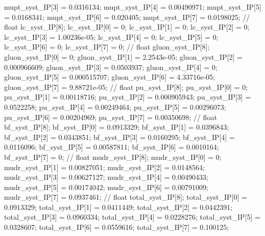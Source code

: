 mupt_syst_IP[3] = 0.0316134; mupt_syst_IP[4] = 0.00490971; mupt_syst_IP[5] = 0.0168341; 
mupt_syst_IP[6] = 0.020405; mupt_syst_IP[7] = 0.0198025; 
// float lc_syst_IP[8];
lc_syst_IP[0] = 0; lc_syst_IP[1] = 0; lc_syst_IP[2] = 0; 
lc_syst_IP[3] = 1.00236e-05; lc_syst_IP[4] = 0; lc_syst_IP[5] = 0; 
lc_syst_IP[6] = 0; lc_syst_IP[7] = 0; 
// float gluon_syst_IP[8];
gluon_syst_IP[0] = 0; gluon_syst_IP[1] = 2.2543e-05; gluon_syst_IP[2] = 0.000966609; 
gluon_syst_IP[3] = 0.0503937; gluon_syst_IP[4] = 0; gluon_syst_IP[5] = 0.000515707; 
gluon_syst_IP[6] = 4.33716e-05; gluon_syst_IP[7] = 9.88721e-05; 
// float pu_syst_IP[8];
pu_syst_IP[0] = 0; pu_syst_IP[1] = 0.00118716; pu_syst_IP[2] = 0.000905943; 
pu_syst_IP[3] = 0.0522258; pu_syst_IP[4] = 0.00249464; pu_syst_IP[5] = 0.00296073; 
pu_syst_IP[6] = 0.00204969; pu_syst_IP[7] = 0.00350698; 
// float bf_syst_IP[8];
bf_syst_IP[0] = 0.0913329; bf_syst_IP[1] = 0.0396843; bf_syst_IP[2] = 0.0343851; 
bf_syst_IP[3] = 0.0160295; bf_syst_IP[4] = 0.0116096; bf_syst_IP[5] = 0.00587811; 
bf_syst_IP[6] = 0.0010164; bf_syst_IP[7] = 0; 
// float mudr_syst_IP[8];
mudr_syst_IP[0] = 0; mudr_syst_IP[1] = 0.00827051; mudr_syst_IP[2] = 0.0148564; 
mudr_syst_IP[3] = 0.00627127; mudr_syst_IP[4] = 0.00490433; mudr_syst_IP[5] = 0.00174042; 
mudr_syst_IP[6] = 0.00791009; mudr_syst_IP[7] = 0.0937461; 
// float total_syst_IP[8];
total_syst_IP[0] = 0.0913329; total_syst_IP[1] = 0.0411449; total_syst_IP[2] = 0.0442391; 
total_syst_IP[3] = 0.0960334; total_syst_IP[4] = 0.0228276; total_syst_IP[5] = 0.0328607; 
total_syst_IP[6] = 0.0559616; total_syst_IP[7] = 0.100125; 



